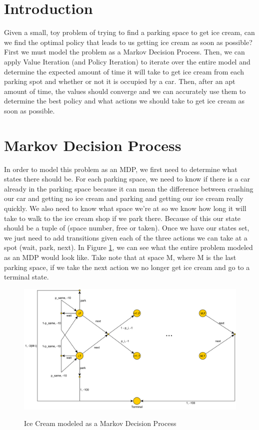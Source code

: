 \documentclass[12pt]{article}
\begin{document}
\maketitle

\section{Introduction}

Given a small, toy problem of trying to find a parking space to get ice cream, can we find the optimal policy that leads to us getting ice cream as soon as possible? First we must model the problem as a Markov Decision Process. Then, we can apply Value Iteration (and Policy Iteration) to iterate over the entire model and determine the expected amount of time it will take to get ice cream from each parking spot and whether or not it is occupied by a car. Then, after an apt amount of time, the values should converge and we can accurately use them to determine the best policy and what actions we should take to get ice cream as soon as possible.

\section{Markov Decision Process}

In order to model this problem as an MDP, we first need to determine what states there should be. For each parking space, we need to know if there is a car already in the parking space because it can mean the difference between crashing our car and getting no ice cream and parking and getting our ice cream really quickly. We also need to know what space we're at so we know how long it will take to walk to the ice cream shop if we park there. Because of this our state should be a tuple of (space number, free or taken). Once we have our states set, we just need to add transitions given each of the three actions we can take at a spot (wait, park, next). In Figure \ref{fig:mdp}, we can see what the entire problem modeled as an MDP would look like. Take note that at space M, where M is the last parking space, if we take the next action we no longer get ice cream and go to a terminal state.

\begin{figure}
  \includegraphics[width=0.95\linewidth]{Figures/MDP.png}
  \centering
  \label{fig:mdp}
  \caption{Ice Cream modeled as a Markov Decision Process}
\end{figure}
\end{document}
